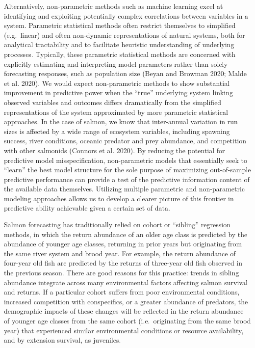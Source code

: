 \documentclass[
]{article}
\begin{document}
Alternatively, non-parametric methods such as machine learning excel at identifying and exploiting potentially complex correlations between variables in a system. Parametric statistical methods often restrict themselves to simplified (e.g.~linear) and often non-dynamic representations of natural systems, both for analytical tractability and to facilitate heuristic understanding of underlying processes. Typically, these parametric statistical methods are concerned with explicitly estimating and interpreting model parameters rather than solely forecasting responses, such as population size (Beyan and Browman 2020; Malde et al. 2020). We would expect non-parametric methods to show substantial improvement in predictive power when the ``true'' underlying system linking observed variables and outcomes differs dramatically from the simplified representations of the system approximated by more parametric statistical approaches. In the case of salmon, we know that inter-annual variation in run sizes is affected by a wide range of ecosystem variables, including spawning success, river conditions, oceanic predator and prey abundance, and competition with other salmonids (Connors et al. 2020). By reducing the potential for predictive model misspecification, non-parametric models that essentially seek to ``learn'' the best model structure for the sole purpose of maximizing out-of-sample predictive performance can provide a test of the predictive information content of the available data themselves. Utilizing multiple parametric and non-parametric modeling approaches allows us to develop a clearer picture of this frontier in predictive ability achievable given a certain set of data.

Salmon forecasting has traditionally relied on cohort or ``sibling'' regression methods, in which the return abundance of an older age class is predicted by the abundance of younger age classes, returning in prior years but originating from the same river system and brood year. For example, the return abundance of four-year old fish are predicted by the returns of three-year old fish observed in the previous season. There are good reasons for this practice: trends in sibling abundance integrate across many environmental factors affecting salmon survival and returns. If a particular cohort suffers from poor environmental conditions, increased competition with conspecifics, or a greater abundance of predators, the demographic impacts of these changes will be reflected in the return abundance of younger age classes from the same cohort (i.e.~originating from the same brood year) that experienced similar environmental conditions or resource availability, and by extension survival, as juveniles.
\end{document}
